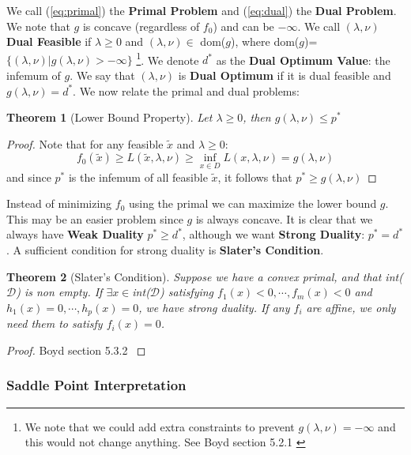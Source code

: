\documentclass[]{article}
\theoremstyle{mattstyle}
\newtheorem{theorem}{Theorem}[section]
\theoremstyle{definition}
\begin{document}
We call (\ref{eq:primal}) the \textbf{Primal Problem} and (\ref{eq:dual}) the \textbf{Dual Problem}. We note that $g$ is concave (regardless of $f_0$) and can be $-\infty$. We call $(\lambda, \nu)$ \textbf{Dual Feasible} if $\lambda \ge 0$ and $(\lambda, \nu) \in$ dom($g$), where dom($g$)=$\{ (\lambda, \nu) | g(\lambda, \nu)>-\infty\}$ \footnote{We note that we could add extra constraints to prevent $g(\lambda, \nu)=-\infty$ and this would not change anything. See Boyd section 5.2.1 \cite{Boyd:2004:CO:993483}}. We denote $d^*$ as the \textbf{Dual Optimum Value}: the infemum of $g$. We say that $(\lambda,\nu)$ is \textbf{Dual Optimum} if it is dual feasible and $g(\lambda,\nu)=d^*$. We now relate the primal and dual problems:
\begin{theorem}[Lower Bound Property]
	Let $\lambda \ge 0$, then $g(\lambda, \nu) \le p^*$ 
\end{theorem}
\begin{proof}
	Note that for any feasible $\tilde{x}$ and $\lambda \ge 0$:
	$$f_0(\tilde{x}) \ge L(\tilde{x}, \lambda, \nu) \ge \inf\limits_{x\in D} L(x,\lambda,\nu) = g(\lambda, \nu)$$
	and since $p^*$ is the infemum of all feasible $\tilde{x}$, it follows that $ p^* \ge g(\lambda, \nu)$
\end{proof}

Instead of minimizing $f_0$ using the primal we can maximize the lower bound $g$. This may be an easier problem since $g$ is always concave. It is clear that we always have \textbf{Weak Duality} $p^* \ge d^*$, although we want \textbf{Strong Duality}: $p^* = d^*$. A sufficient condition for strong duality is \textbf{Slater's Condition}.

\begin{theorem}[Slater's Condition]
	Suppose we have a convex primal, and that int($\mathcal{D}$) is non empty. If $\exists x \in$int($\mathcal{D}$) satisfying $f_1(x)<0, \cdots, f_m(x)<0$ and $h_1(x)=0, \cdots, h_p(x)=0$, we have strong duality. If any $f_i$ are affine, we only need them to satisfy $f_i(x)=0$.
\end{theorem}
\begin{proof}
	Boyd section 5.3.2 \cite{Boyd:2004:CO:993483}
\end{proof}

\subsubsection{Saddle Point Interpretation}
\end{document}
